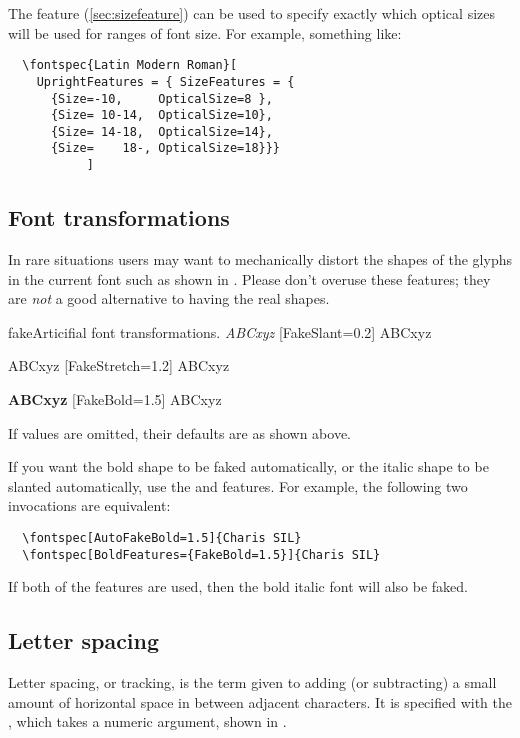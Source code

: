 \documentclass[a4paper]{l3doc}
\begin{document}
The  feature (\vref{sec:sizefeature}) can be
used to specify exactly which optical sizes will be used for ranges
of font size. For example, something like:
\begin{Verbatim}
  \fontspec{Latin Modern Roman}[
    UprightFeatures = { SizeFeatures = {
      {Size=-10,     OpticalSize=8 },
      {Size= 10-14,  OpticalSize=10},
      {Size= 14-18,  OpticalSize=14},
      {Size=    18-, OpticalSize=18}}}
           ]
\end{Verbatim}

\subsection{Font transformations}

In rare situations users may want to mechanically distort the shapes of the glyphs in the current font such as shown in . Please don't overuse these features; they are \emph{not} a good alternative to having the real shapes.

\begin{Xexample}{fake}{Articifial font transformations.}
   \emph{ABCxyz} \quad
  [FakeSlant=0.2] ABCxyz

    ABCxyz \quad
  [FakeStretch=1.2] ABCxyz

   \textbf{ABCxyz} \quad
  [FakeBold=1.5] ABCxyz
\end{Xexample}

If values are omitted, their defaults are as shown above.

If you want the bold shape to be faked automatically, or the italic shape
to be slanted automatically, use the  and
 features. For example, the following two invocations
are equivalent:
\begin{Verbatim}
  \fontspec[AutoFakeBold=1.5]{Charis SIL}
  \fontspec[BoldFeatures={FakeBold=1.5}]{Charis SIL}
\end{Verbatim}
If both of the  features are used, then the bold italic
font will also be faked.


\subsection{Letter spacing}
Letter spacing, or tracking, is the term given to adding (or subtracting) a small amount of horizontal space in between adjacent characters. It is specified with the , which takes a numeric argument,
shown in .
\end{document}
